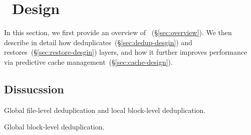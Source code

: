 \section{\sysname~Design}
\label{sec:Sift}

%
In this section, we first provide an overview of
\sysname~(\S\ref{sec:overview}).
%
We then describe in detail how \sysname deduplicates~(\S\ref{sec:dedup-desgin})
and restores~(\S\ref{sec:restore-desgin}) layers, and how it further improves
performance via predictive cache management~(\S\ref{sec:cache-design}).










\subsection{Dissucssion}

Global file-level deduplication and local block-level deduplication.

Global block-level deduplication.
